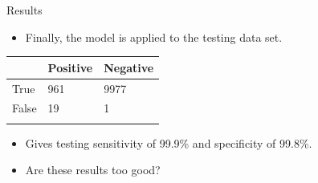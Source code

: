 \documentclass{beamer}
\begin{document}
\begin{frame}{Results}
\begin{itemize}
\item Finally, the model is applied to the testing data set.
\end{itemize}
\begin{table}[ht]
	\centering
	\begin{tabular}{@{}lll@{}}
	\toprule[1.5pt]
	& Positive & Negative\\
	\midrule
	True & 961 & 9977\\
	False & 19 & 1\\
	\bottomrule[1.5pt]\\
	\end{tabular}
\end{table}
\begin{itemize}
\item Gives testing sensitivity of 99.9\% and specificity of 99.8\%.
\pause
\item Are these results too good?
\end{itemize}
\end{frame}
\end{document}

